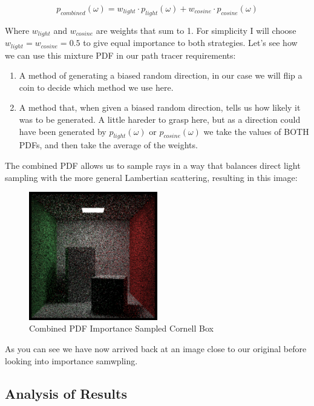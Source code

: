 \documentclass[12pt]{article}
\begin{document}
$$p_{combined}(\omega) = w_{light} \cdot p_{light}(\omega) + w_{cosine} \cdot p_{cosine}(\omega)$$

Where $w_{light}$ and $w_{cosine}$ are weights that sum to 1. For simplicity I will choose $w_{light} = w_{cosine} = 0.5$ to give equal importance to both strategies. Let's see how we can use this mixture PDF in our path tracer requirements:

\begin{enumerate}
    \item A method of generating a biased random direction, in our case we will flip a coin to decide which method we use here.
    \item A method that, when given a biased random direction, tells us how likely it was to be generated. A little hareder to grasp here, but as a direction could have been generated by $p_{light}(\omega)$ or $p_{cosine}(\omega)$ we take the values of BOTH PDFs, and then take the average of the weights.
\end{enumerate}


The combined PDF allows us to sample rays in a way that balances direct light sampling with the more general Lambertian scattering, resulting in this image:

\begin{figure}[H]
    \centering
    \includegraphics[width=0.5\textwidth]{images/one_samp/combined_pdf.png}
    \caption{Combined PDF Importance Sampled Cornell Box}
    \label{fig:combinedPDFimportancesampled}
\end{figure}

As you can see we have now arrived back at an image close to our original before looking into importance samwpling.

\subsection{Analysis of Results}
\end{document}

